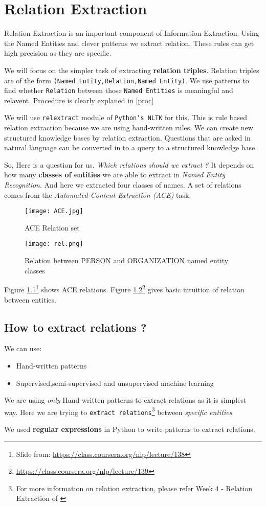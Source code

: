 \documentclass[12pt]{report}
\begin{document}
\chapter{Relation Extraction}
\par Relation Extraction is an important component of Information Extraction.
Using the Named Entities and clever patterns we extract relation. These rules can 
get high precision as they are specific.
\par We will focus on the simpler task of extracting \textbf{relation triples}. Relation
triples are of the form \texttt{(Named Entity,Relation,Named Entity)}.
We use patterns to find whether \texttt{Relation} between those \texttt{Named Entities}
 is meaningful and relavent. Procedure is clearly explaned in \ref{proc}
\par We will use \texttt{relextract} module of \texttt{Python's NLTK} for this.
 This is rule based relation extraction because we are using hand-written rules.
We can create new structured knowledge bases by relation extraction.
Questions that are asked in natural language can be converted in to a query to a structured
knowledge base.
\par So, Here is a question for us. \textit{Which relations should we extract ?} It depends
on how many \textbf{classes of entities} we are able to extract in \textit{Named Entity Recognition}.
And here we extracted four classes of names. A set of relations  comes from the \textit{Automated Content Extraction (ACE)} task.


\begin{figure}[htp]
\centering
\texttt{[image: ACE.jpg]}
\caption{ACE Relation set}
\label{ACE}
\end{figure}



\begin{figure}[htp]
\centering
\texttt{[image: rel.png]}
\caption{Relation between PERSON and ORGANIZATION named entity classes}
\label{IE2}
\end{figure}
Figure \ref{ACE}\footnote{Slide from: \url{https://class.coursera.org/nlp/lecture/138}}
 shows ACE relations.
Figure \ref{IE2}\footnote{\url{https://class.coursera.org/nlp/lecture/139}} gives basic intuition of relation between entities.

\section{How to extract relations ?}
We can use:
\begin{itemize}
\item Hand-written patterns
\item Supervised,semi-supervised and unsupervised machine learning
\end{itemize}
We are using \textit{only} Hand-written patterns to extract relations as it is simplest
way. Here we are trying to \texttt{extract relations}\footnote{For more information on relation extraction, please refer Week 4 - Relation Extraction of \cite{SNLP}} between \textit{specific entities}.
\par We used \textbf{regular expressions } \cite{re} in Python to write patterns to extract relations.
\end{document}
